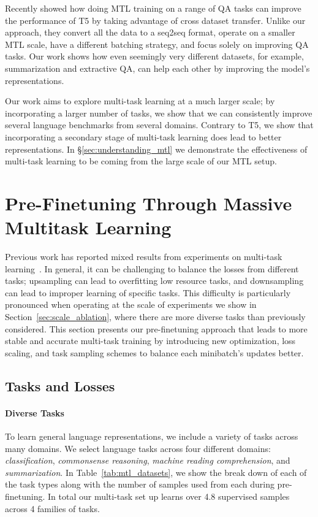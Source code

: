 \documentclass[11pt,a4paper]{article}
\begin{document}
Recently \citet{unifiedqa} showed how doing MTL training on a range of QA tasks can improve the performance of T5 by taking advantage of cross dataset transfer. Unlike our approach, they convert all the data to a seq2seq format, operate on a smaller MTL scale, have a different batching strategy, and focus solely on improving QA tasks. Our work shows how even seemingly very different datasets, for example, summarization and extractive QA, can help each other by improving the model's representations.

Our work aims to explore multi-task learning at a much larger scale; by incorporating a larger number of tasks, we show that we can consistently improve several language benchmarks from several domains. Contrary to T5, we show that incorporating a secondary stage of multi-task learning does lead to better representations. In \S \ref{sec:understanding_mtl} we demonstrate the effectiveness of multi-task learning to be coming from the large scale of our MTL setup.

\section{Pre-Finetuning Through Massive Multitask Learning}


Previous work has reported mixed results from experiments on multi-task learning~\cite{MT_DNN, T5}. In general, it can be challenging to balance the losses from different tasks; upsampling can lead to overfitting low resource tasks, and downsampling can lead to improper learning of specific tasks. This difficulty is particularly pronounced when operating at the scale of experiments we show in Section~\ref{sec:scale_ablation}, where there are more diverse tasks than previously considered. This section presents our pre-finetuning approach that leads to more stable and accurate multi-task training by introducing new optimization, loss scaling, and task sampling schemes to balance each minibatch's updates better.

\subsection{Tasks and Losses}

\paragraph{Diverse Tasks}
To learn general language representations, we include a variety of tasks across many domains. We select language tasks across four different domains: \textit{classification}, \textit{commonsense reasoning}, \textit{machine reading comprehension}, and \textit{summarization}. In Table~\ref{tab:mtl_datasets}, we show the break down of each of the task types along with the number of samples used from each during pre-finetuning. In total our multi-task set up learns over 4.8 supervised samples across 4 families of tasks.
\end{document}
